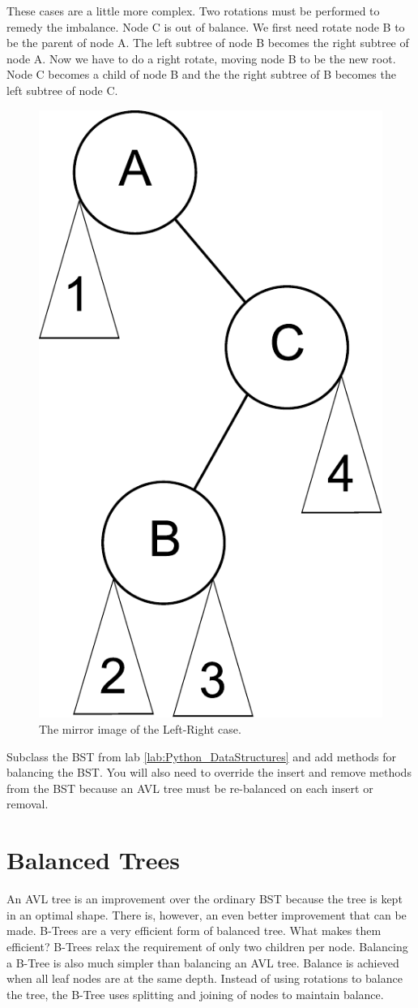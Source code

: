 These cases are a little more complex.
Two rotations must be performed to remedy the imbalance.
Node C is out of balance.
We first need rotate node B to be the parent of node A.
The left subtree of node B becomes the right subtree of node A.
Now we have to do a right rotate, moving node B to be the new root.
Node C becomes a child of node B and the the right subtree of B becomes the left subtree of node C.

\begin{figure}[h]
\includegraphics[width=.33\textwidth]{right_left.pdf}
\caption{The mirror image of the Left-Right case.}
\end{figure}

\begin{problem}
Subclass the BST from lab \ref{lab:Python_DataStructures} and add methods for balancing the BST.
You will also need to override the insert and remove methods from the BST because an AVL tree must be re-balanced on each insert or removal.
\end{problem}

\section*{Balanced Trees}
An AVL tree is an improvement over the ordinary BST because the tree is kept in an optimal shape.
There is, however, an even better improvement that can be made.
B-Trees are a very efficient form of balanced tree.
What makes them efficient?  B-Trees relax the requirement of only two children per node.
Balancing a B-Tree is also much simpler than balancing an AVL tree.
Balance is achieved when all leaf nodes are at the same depth.
Instead of using rotations to balance the tree, the B-Tree uses splitting and joining of nodes to maintain balance.

